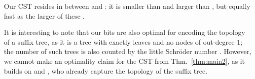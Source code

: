 \documentclass[11pt,onecolumn,final]{article} \usepackage{a4}
\theoremstyle{plain}
\theoremstyle{remark}
\begin{document}
Our CST resides in between \cite{ohlebusch09compressed} and \cite{ohlebusch10cst++}: it is smaller than \cite{ohlebusch10cst++} and larger than \cite{ohlebusch09compressed}, but equally fast as the larger of these \cite{ohlebusch10cst++}.

It is interesting to note that our  bits are also optimal for encoding the topology of a suffix tree, as it is a tree with exactly  leaves and no nodes of out-degree 1; the number of such trees is also counted by the little Schr\"oder number . However, we cannot make an optimality claim for the CST from Thm.~\ref{thm:main2}, as it builds on  and , who already capture the topology of the suffix tree.



\end{document}
